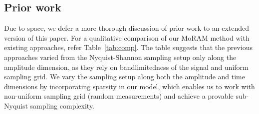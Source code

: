 \subsection{Prior work}
\label{sec:prior}

Due to space, we defer a more thorough discussion of prior work to an extended version of this paper. For a qualitative comparison of our MoRAM method with existing approaches, refer Table~\ref{tab:comp}. The table suggests that the previous approaches varied from the Nyquist-Shannon sampling setup only along the amplitude dimension, as they rely on bandlimitedness of the signal and uniform sampling grid. We vary the sampling setup along both the amplitude and time dimensions by incorporating sparsity in our model, which enables us to work with non-uniform sampling grid (random measurements) and achieve a provable sub-Nyquist sampling complexity.

